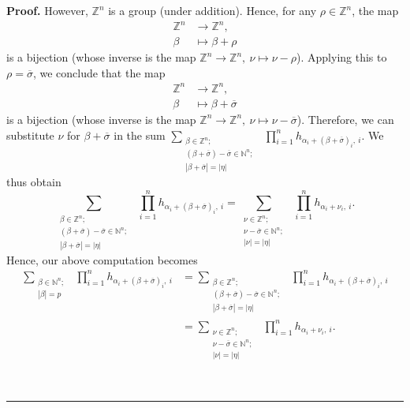 \documentclass
[numbers=enddot,12pt,final,onecolumn,notitlepage,english]{scrartcl}%
\theoremstyle{definition}
\newenvironment{proof}[1][Proof]{\noindent\textbf{#1.} }{\ \rule{0.5em}{0.5em}}
\let\sumnonlimits\sum
\let\prodnonlimits\prod
\renewcommand{\sum}{\sumnonlimits\limits}
\renewcommand{\prod}{\prodnonlimits\limits}
\newenvironment{verlong}{}{}
\begin{document}
\begin{verlong}
\begin{proof}
However, $\mathbb{Z}^{n}$ is a group (under addition). Hence, for any $\rho
\in\mathbb{Z}^{n}$, the map%
\begin{align*}
\mathbb{Z}^{n}  &  \rightarrow\mathbb{Z}^{n},\\
\beta &  \mapsto\beta+\rho
\end{align*}
is a bijection (whose inverse is the map $\mathbb{Z}^{n}\rightarrow
\mathbb{Z}^{n},\ \nu\mapsto\nu-\rho$). Applying this to $\rho=\overline
{\sigma}$, we conclude that the map
\begin{align*}
\mathbb{Z}^{n}  &  \rightarrow\mathbb{Z}^{n},\\
\beta &  \mapsto\beta+\overline{\sigma}%
\end{align*}
is a bijection (whose inverse is the map $\mathbb{Z}^{n}\rightarrow
\mathbb{Z}^{n},\ \nu\mapsto\nu-\overline{\sigma}$). Therefore, we can
substitute $\nu$ for $\beta+\overline{\sigma}$ in the sum $\sum
_{\substack{\beta\in\mathbb{Z}^{n};\\\left(  \beta+\overline{\sigma}\right)
-\overline{\sigma}\in\mathbb{N}^{n};\\\left\vert \beta+\overline{\sigma
}\right\vert =\left\vert \eta\right\vert }}\ \ \prod_{i=1}^{n}h_{\alpha
_{i}+\left(  \beta+\overline{\sigma}\right)  _{i},\ i}$. We thus obtain%
\[
\sum_{\substack{\beta\in\mathbb{Z}^{n};\\\left(  \beta+\overline{\sigma
}\right)  -\overline{\sigma}\in\mathbb{N}^{n};\\\left\vert \beta
+\overline{\sigma}\right\vert =\left\vert \eta\right\vert }}\ \ \prod
_{i=1}^{n}h_{\alpha_{i}+\left(  \beta+\overline{\sigma}\right)  _{i},\ i}%
=\sum_{\substack{\nu\in\mathbb{Z}^{n};\\\nu-\overline{\sigma}\in\mathbb{N}%
^{n};\\\left\vert \nu\right\vert =\left\vert \eta\right\vert }}\ \ \prod
_{i=1}^{n}h_{\alpha_{i}+\nu_{i},\ i}.
\]
Hence, our above computation becomes%
\begin{align}
\sum_{\substack{\beta\in\mathbb{N}^{n};\\\left\vert \beta\right\vert
=p}}\ \ \prod_{i=1}^{n}h_{\alpha_{i}+\left(  \beta+\overline{\sigma}\right)
_{i},\ i}  &  =\sum_{\substack{\beta\in\mathbb{Z}^{n};\\\left(  \beta
+\overline{\sigma}\right)  -\overline{\sigma}\in\mathbb{N}^{n};\\\left\vert
\beta+\overline{\sigma}\right\vert =\left\vert \eta\right\vert }%
}\ \ \prod_{i=1}^{n}h_{\alpha_{i}+\left(  \beta+\overline{\sigma}\right)
_{i},\ i}\nonumber\\
&  =\sum_{\substack{\nu\in\mathbb{Z}^{n};\\\nu-\overline{\sigma}\in
\mathbb{N}^{n};\\\left\vert \nu\right\vert =\left\vert \eta\right\vert
}}\ \ \prod_{i=1}^{n}h_{\alpha_{i}+\nu_{i},\ i}.
\label{pf.thm.pre-pieri.innersum}%
\end{align}



\end{proof}
\end{verlong}
\end{document}
